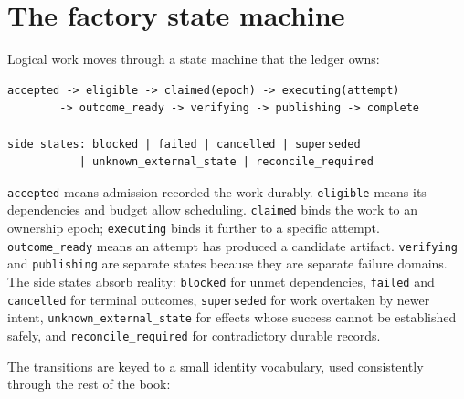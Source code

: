 \hypertarget{the-factory-state-machine}{%
\section*{The factory state machine}\label{the-factory-state-machine}}

Logical work moves through a state machine that the ledger owns:

\begin{verbatim}
accepted -> eligible -> claimed(epoch) -> executing(attempt)
        -> outcome_ready -> verifying -> publishing -> complete

side states: blocked | failed | cancelled | superseded
           | unknown_external_state | reconcile_required
\end{verbatim}

\texttt{accepted} means admission recorded the work durably. \texttt{eligible} means its dependencies and budget allow scheduling. \texttt{claimed} binds the work to an ownership epoch; \texttt{executing} binds it further to a specific attempt. \texttt{outcome\_ready} means an attempt has produced a candidate artifact. \texttt{verifying} and \texttt{publishing} are separate states because they are separate failure domains. The side states absorb reality: \texttt{blocked} for unmet dependencies, \texttt{failed} and \texttt{cancelled} for terminal outcomes, \texttt{superseded} for work overtaken by newer intent, \texttt{unknown\_external\_state} for effects whose success cannot be established safely, and \texttt{reconcile\_required} for contradictory durable records.

The transitions are keyed to a small identity vocabulary, used consistently through the rest of the book:

